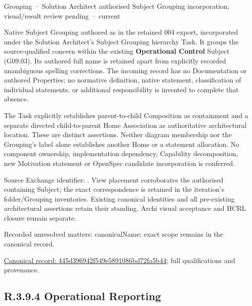 \label{element:445d396942f549e5891086bd72fa5b44}
{\small Grouping · Solution Architect authorised Subject Grouping incorporation; visual/result review pending · current}\par

Native Subject Grouping authored as \texttt{} in the retained 004 export,
incorporated under the Solution Architect's Subject Grouping hierarchy Task.
It groups the source-qualified \texttt{} concern within
the existing \textbf{Operational Control} Subject (G09.03). Its authored full name
is retained apart from explicitly recorded unambiguous spelling corrections.
The incoming record has no Documentation or authored Properties; no normative
definition, native statement, classification of individual statements, or
additional responsibility is invented to complete that absence.



The Task explicitly establishes parent-to-child Composition as containment and
a separate directed child-to-parent Home Association as authoritative architectural
location. These are distinct assertions. Neither diagram membership nor the
Grouping's label alone establishes another Home or a statement allocation.
No component ownership, implementation dependency, Capability decomposition,
new Motivation statement or OpenSpec candidate incorporation is conferred.



Source Exchange identifier: \texttt{}. View placement corroborates
the authorised containing Subject; the exact correspondence is retained in the
iteration's folder/Grouping inventories. Existing canonical identities and all
pre-existing architectural assertions retain their standing. Archi visual
acceptance and HCRL closure remain separate.


{\small Recorded unresolved matters: canonicalName; exact scope remains in the canonical record.}\par
{\footnotesize \href{../../../../continuum/grouping/445d396942f549e5891086bd72fa5b44.md}{Canonical record: 445d396942f549e5891086bd72fa5b44}; full qualifications and provenance.}\par
\subsection*{R.3.9.4 Operational Reporting}
\label{navigation:R.3.9.4}

